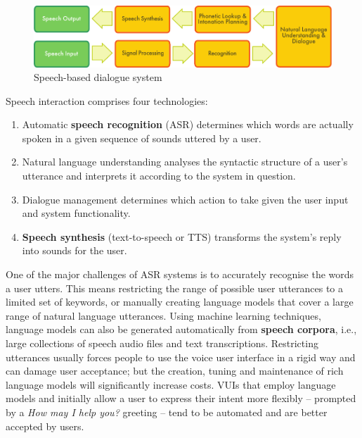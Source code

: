 \begin{multicols}{2}
\begin{figure}[htb]
  \center
  \includegraphics[width=\textwidth]{../_media/english/simple_speech-based_dialogue_architecture}
  \caption{Speech-based dialogue system}
  \label{fig:dialoguearch_en}
\end{figure}


Speech interaction comprises four technologies:
\begin{enumerate}
  \item Automatic \textbf{speech recognition} (ASR) determines which words are actually spoken in a given sequence of sounds uttered by a user.  
  \columnbreak
  \item Natural language understanding analyses the syntactic structure of a user’s utterance and interprets it according to the system in question.
  \item Dialogue management determines which action to take given the user input and system functionality.   
  \item \textbf{Speech synthesis} (text-to-speech or TTS) transforms the system’s reply into sounds for the user.
\end{enumerate}

One of the major challenges of ASR systems is to accurately recognise the words a user utters. This means restricting the range of possible user utterances to a limited set of keywords, or manually creating language models that cover a large range of natural language utterances. Using machine learning techniques, language models can also be generated automatically from \textbf{speech corpora}, i.e., large collections of speech audio files and text transcriptions. Restricting utterances usually forces people to use the voice user interface in a rigid way and can damage user acceptance; but the creation, tuning and maintenance of rich language models will significantly increase costs. VUIs that employ language models and initially allow a user to express their intent more flexibly -- prompted by a \textit{How may I help you?} greeting -- tend to be automated and are better accepted by users. 


\end{multicols}
